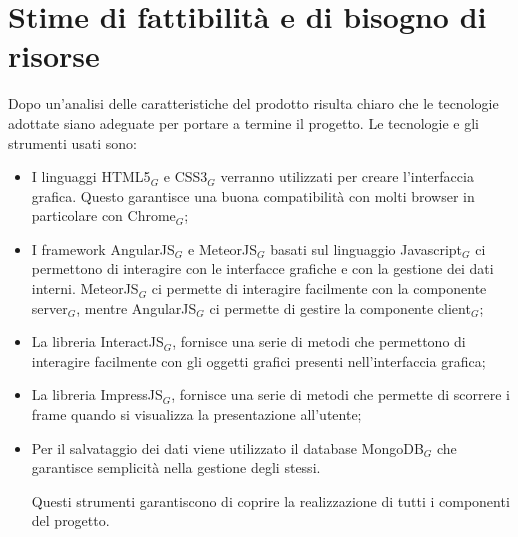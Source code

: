 \newpage
\section{Stime di fattibilità e di bisogno di risorse}
Dopo un'analisi delle caratteristiche del prodotto risulta chiaro che le tecnologie adottate siano adeguate per portare a termine il progetto.
Le tecnologie e gli strumenti usati sono:
\begin{itemize}
\item I linguaggi HTML5$_G$ e CSS3$_G$ verranno utilizzati per creare l'interfaccia grafica. Questo garantisce una buona compatibilità con molti browser in particolare con Chrome$_G$;
\item I framework AngularJS$_G$ e MeteorJS$_G$ basati sul linguaggio Javascript$_G$ ci permettono di interagire con le interfacce grafiche e con la gestione dei dati interni. MeteorJS$_G$ ci permette di interagire facilmente con la componente server$_G$, mentre AngularJS$_G$ ci permette di gestire la componente client$_G$;
\item La libreria InteractJS$_G$, fornisce una serie di metodi che permettono di interagire facilmente con gli oggetti grafici presenti nell'interfaccia grafica;
\item La libreria ImpressJS$_G$, fornisce una serie di metodi che permette di scorrere i frame quando si visualizza la presentazione all'utente;
\item Per il salvataggio dei dati viene utilizzato il database MongoDB$_G$ che garantisce semplicità nella gestione degli stessi.

Questi strumenti garantiscono di coprire la realizzazione di tutti i componenti del progetto.   
\end{itemize}